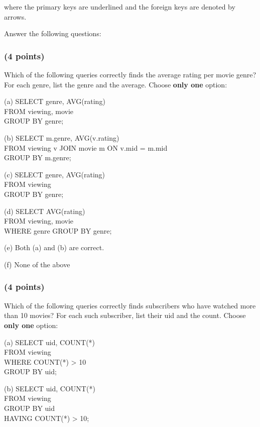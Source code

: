 \documentclass[11pt,a4paper]{article}
\begin{document}
where the primary keys are underlined and the foreign keys are denoted by arrows.

Answer the following questions:

\subsubsection{(4 points)}
Which of the following queries correctly finds the average rating per movie genre? For each genre, list the genre and the average. Choose \textbf{only one} option:

(a) SELECT genre, AVG(rating)\\
\phantom{xxxx}FROM viewing, movie\\
\phantom{xxxx}GROUP BY genre;

(b) SELECT m.genre, AVG(v.rating)\\
\phantom{xxxx}FROM viewing v JOIN movie m ON v.mid = m.mid\\
\phantom{xxxx}GROUP BY m.genre;

(c) SELECT genre, AVG(rating)\\
\phantom{xxxx}FROM viewing\\
\phantom{xxxx}GROUP BY genre;

(d) SELECT AVG(rating)\\
\phantom{xxxx}FROM viewing, movie\\
\phantom{xxxx}WHERE genre GROUP BY genre;

(e) Both (a) and (b) are correct.

(f) None of the above

\subsubsection{(4 points)}
Which of the following queries correctly finds subscribers who have watched more than 10 movies? For each such subscriber, list their uid and the count. Choose \textbf{only one} option:

(a) SELECT uid, COUNT(*)\\
\phantom{xxxx}FROM viewing\\
\phantom{xxxx}WHERE COUNT(*) > 10\\
\phantom{xxxx}GROUP BY uid;

(b) SELECT uid, COUNT(*)\\
\phantom{xxxx}FROM viewing\\
\phantom{xxxx}GROUP BY uid\\
\phantom{xxxx}HAVING COUNT(*) > 10;
\end{document}
